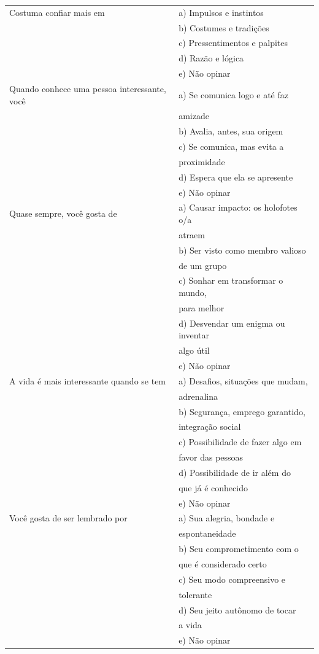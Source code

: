 \documentclass[
	12pt,				%
    oneside,			%
	a4paper,			%
	english,			%
	french,				%
	spanish,			%
	brazil,				%
	]{abntex2}
\begin{document}
\begin{apendicesenv}
\begin{center}
\begin{longtable}{l|l}
    Costuma confiar mais em & a) Impulsos e instintos \\ & b) Costumes e tradições\\ & c) Pressentimentos e palpites\\ & d) Razão e lógica\\ & e) Não opinar        \\ \hline
    Quando conhece uma pessoa interessante, você & a) Se comunica logo e até faz \\ & amizade\\ & b) Avalia, antes, sua origem\\ & c) Se comunica, mas evita a \\ & proximidade\\ & d) Espera que ela se apresente\\ & e) Não opinar
    \\ \hline
    Quase sempre, você gosta de & a) Causar impacto: os holofotes o/a \\ & atraem \\ & b) Ser visto como membro valioso \\ & de um grupo\\ & c) Sonhar em transformar o mundo, \\ & para melhor\\ & d) Desvendar um enigma ou inventar \\ & algo útil\\ & e) Não opinar
    \\ \hline
    A vida é mais interessante quando se tem & a) Desafios, situações que mudam,\\ & adrenalina\\ & b) Segurança, emprego garantido,\\ & integração social\\ & c) Possibilidade de fazer algo em \\ & favor das pessoas\\ & d) Possibilidade de ir além do \\ & que já é conhecido\\ & e) Não opinar
    \\ \hline
    Você gosta de ser lembrado por & a) Sua alegria, bondade e \\ & espontaneidade\\ & b) Seu comprometimento com o \\ & que é considerado certo\\ & c) Seu modo compreensivo e \\ & tolerante\\ & d) Seu jeito autônomo de tocar \\ & a vida\\ & e) Não opinar

\end{longtable}
\end{center}
\end{apendicesenv}
\end{document}
